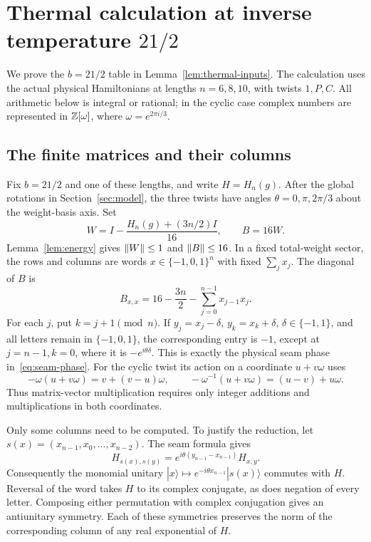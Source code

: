 \section{Thermal calculation at inverse temperature \texorpdfstring{$21/2$}{21/2}}
\label{sec:thermal120}

We prove the $b=21/2$ table in Lemma~\ref{lem:thermal-inputs}.
The calculation uses the actual physical Hamiltonians at lengths
$n=6,8,10$, with twists $1,P,C$.  All arithmetic below is integral or
rational; in the cyclic case complex numbers are represented in
$\mathbb Z[\omega]$, where $\omega=e^{2\pi i/3}$.

\subsection{The finite matrices and their columns}

Fix $b=21/2$ and one of these lengths, and write $H=H_n(g)$.
After the global rotations in
Section~\ref{sec:model}, the three twists have angles
$\theta=0,\pi,2\pi/3$ about the weight-basis axis.
Set
\begin{equation}\label{eq:thermal120-matrices}
 W=I-\frac{H_n(g)+(3n/2)I}{16},\qquad B=16W.
\end{equation}
Lemma~\ref{lem:energy} gives $\left\lVert W\right\rVert\le1$ and $\left\lVert B\right\rVert\le16$.
In a fixed total-weight sector, the rows and columns are words
$x\in\{-1,0,1\}^n$ with fixed $\sum_jx_j$.  The diagonal of $B$ is
\[
 B_{x,x}=16-\frac{3n}{2}-\sum_{j=0}^{n-1}x_{j-1}x_j.
\]
For each $j$, put $k=j+1\pmod n$.  If
$y_j=x_j-\delta$, $y_k=x_k+\delta$, $\delta\in\{-1,1\}$, and all
letters remain in $\{-1,0,1\}$, the corresponding entry is $-1$, except
at $j=n-1,k=0$, where it is $-e^{i\theta\delta}$.
This is exactly the physical seam phase in~\eqref{eq:seam-phase}.
For the cyclic twist its action on a coordinate $u+v\omega$ uses
\begin{equation}\label{eq:thermal120-phases}
 -\omega(u+v\omega)=v+(v-u)\omega,
 \qquad
 -\omega^{-1}(u+v\omega)=(u-v)+u\omega.
\end{equation}
Thus matrix-vector multiplication requires only integer additions and
multiplications in both coordinates.

Only some columns need to be computed.  To justify the reduction, let
$s(x)=(x_{n-1},x_0,\ldots,x_{n-2})$.  The seam formula gives
\[
 H_{s(x),s(y)}
 =e^{i\theta(y_{n-1}-x_{n-1})}H_{x,y}.
\]
Consequently the monomial unitary
$|x\rangle\mapsto e^{-i\theta x_{n-1}}|s(x)\rangle$ commutes with $H$.
Reversal of the word takes $H$ to its complex conjugate, as does negation
of every letter.  Composing either permutation with complex conjugation
gives an antiunitary symmetry.  Each of these symmetries preserves the
norm of the corresponding column of any real exponential of $H$.

